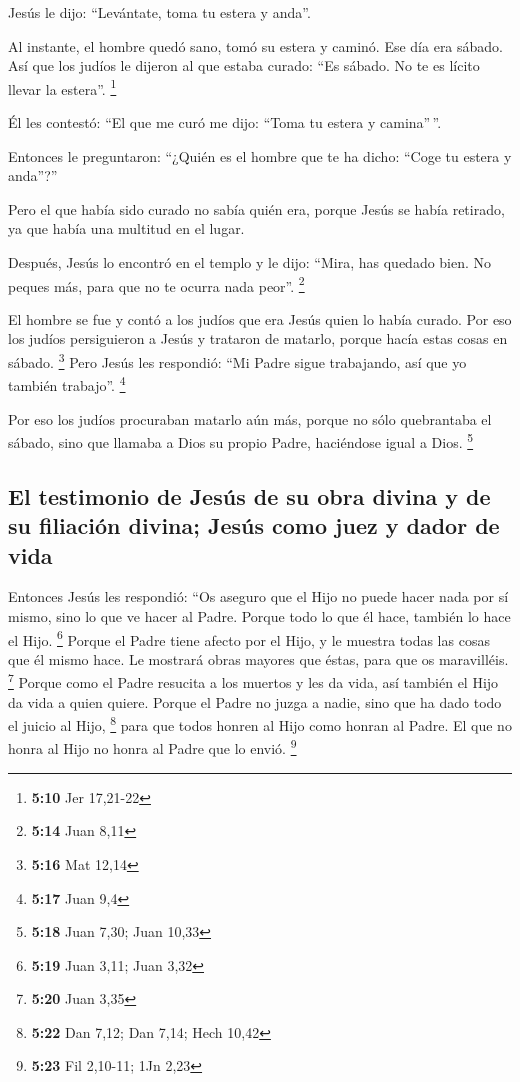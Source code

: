  Jesús le dijo: ``Levántate, toma tu estera y anda''.

 Al instante, el hombre quedó sano, tomó su estera y
caminó. Ese día era sábado.  Así que los judíos le
dijeron al que estaba curado: ``Es sábado. No te es lícito llevar la
estera''. \footnote{\textbf{5:10} Jer 17,21-22}

 Él les contestó: ``El que me curó me dijo: ``Toma tu
estera y camina''\,''.

 Entonces le preguntaron: ``¿Quién es el hombre que te ha
dicho: ``Coge tu estera y anda''?''

 Pero el que había sido curado no sabía quién era, porque
Jesús se había retirado, ya que había una multitud en el lugar.

 Después, Jesús lo encontró en el templo y le dijo:
``Mira, has quedado bien. No peques más, para que no te ocurra nada
peor''. \footnote{\textbf{5:14} Juan 8,11}

 El hombre se fue y contó a los judíos que era Jesús
quien lo había curado.  Por eso los judíos persiguieron a
Jesús y trataron de matarlo, porque hacía estas cosas en sábado.
\footnote{\textbf{5:16} Mat 12,14}  Pero Jesús les
respondió: ``Mi Padre sigue trabajando, así que yo también trabajo''.
\footnote{\textbf{5:17} Juan 9,4}

 Por eso los judíos procuraban matarlo aún más, porque no
sólo quebrantaba el sábado, sino que llamaba a Dios su propio Padre,
haciéndose igual a Dios. \footnote{\textbf{5:18} Juan 7,30; Juan 10,33}

\hypertarget{el-testimonio-de-jesuxfas-de-su-obra-divina-y-de-su-filiaciuxf3n-divina-jesuxfas-como-juez-y-dador-de-vida}{%
\subsection{El testimonio de Jesús de su obra divina y de su filiación
divina; Jesús como juez y dador de
vida}\label{el-testimonio-de-jesuxfas-de-su-obra-divina-y-de-su-filiaciuxf3n-divina-jesuxfas-como-juez-y-dador-de-vida}}

 Entonces Jesús les respondió: ``Os aseguro que el Hijo
no puede hacer nada por sí mismo, sino lo que ve hacer al Padre. Porque
todo lo que él hace, también lo hace el Hijo. \footnote{\textbf{5:19}
  Juan 3,11; Juan 3,32}  Porque el Padre tiene afecto por
el Hijo, y le muestra todas las cosas que él mismo hace. Le mostrará
obras mayores que éstas, para que os maravilléis. \footnote{\textbf{5:20}
  Juan 3,35}  Porque como el Padre resucita a los muertos
y les da vida, así también el Hijo da vida a quien quiere.
 Porque el Padre no juzga a nadie, sino que ha dado todo
el juicio al Hijo, \footnote{\textbf{5:22} Dan 7,12; Dan 7,14; Hech
  10,42}  para que todos honren al Hijo como honran al
Padre. El que no honra al Hijo no honra al Padre que lo envió.
\footnote{\textbf{5:23} Fil 2,10-11; 1Jn 2,23}

